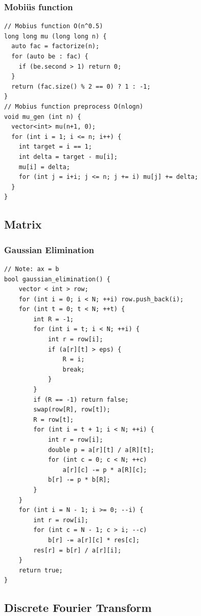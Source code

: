 \documentclass[10pt,letterpaper,landscape]{article}
\begin{document}
\begin{multicols}{2}
\subsubsection{Mobi\"us function}
\begin{lstlisting}
// Mobius function O(n^0.5)
long long mu (long long n) {
  auto fac = factorize(n);
  for (auto be : fac) {
    if (be.second > 1) return 0;
  }
  return (fac.size() % 2 == 0) ? 1 : -1;
}
// Mobius function preprocess O(nlogn)
void mu_gen (int n) {
  vector<int> mu(n+1, 0);
  for (int i = 1; i <= n; i++) {
    int target = i == 1;
    int delta = target - mu[i];
    mu[i] = delta;
    for (int j = i+i; j <= n; j += i) mu[j] += delta;
  }
}
\end{lstlisting}
\subsection{Matrix}
\subsubsection{Gaussian Elimination}
\begin{lstlisting}
// Note: ax = b
bool gaussian_elimination() {
    vector < int > row;
    for (int i = 0; i < N; ++i) row.push_back(i);
    for (int t = 0; t < N; ++t) {
        int R = -1;
        for (int i = t; i < N; ++i) {
            int r = row[i];
            if (a[r][t] > eps) {
                R = i;
                break;
            }
        }
        if (R == -1) return false;
        swap(row[R], row[t]);
        R = row[t];
        for (int i = t + 1; i < N; ++i) {
            int r = row[i];
            double p = a[r][t] / a[R][t];
            for (int c = 0; c < N; ++c)
                a[r][c] -= p * a[R][c];
            b[r] -= p * b[R];
        }
    }
    for (int i = N - 1; i >= 0; --i) {
        int r = row[i];
        for (int c = N - 1; c > i; --c)
            b[r] -= a[r][c] * res[c];
        res[r] = b[r] / a[r][i];
    }
    return true;
}
\end{lstlisting}
\subsection{Discrete Fourier Transform}

\end{multicols}
\end{document}
